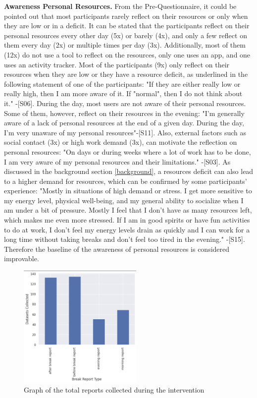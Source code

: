 \documentclass{hasel_thesis}
\begin{document}
\textbf{Awareness Personal Resources.}
From the Pre-Questionnaire, it could be pointed out that most participants rarely reflect on their resources or only when they are low or in a deficit.  It can be stated that the participants reflect on their personal resources every other day (5x) or barely (4x), and only a few reflect on them every day (2x) or multiple times per day (3x).  Additionally, most of them (12x) do not use a tool to reflect on the resources, only one uses an app, and one uses an activity tracker.  Most of the participants (9x) only reflect on their resources when they are low or they have a resource deficit, as underlined in the following statement of one of the participants: "If they are either really low or really high, then I am more aware of it.  If "normal", then I do not think about it." -[S06]. During the day, most users are not aware of their personal resources.  Some of them, however, reflect on their resources in the evening: "I'm generally aware of a lack of personal resources at the end of a given day.  During the day, I'm very unaware of my personal resources"-[S11].  Also, external factors such as social contact (3x) or high work demand (3x), can motivate the reflection on personal resources: "On days or during weeks where a lot of work has to be done, I am very aware of my personal resources and their limitations." -[S03]. As discussed in the background section \ref{background}, a resources deficit can also lead to a higher demand for resources, which can be confirmed by some participants' experience: "Mostly in situations of high demand or stress.  I get more sensitive to my energy level, physical well-being, and my general ability to socialize when I am under a bit of pressure.  Mostly I feel that I don't have as many resources left, which makes me even more stressed.  If I am in good spirits or have fun activities to do at work, I don't feel my energy levels drain as quickly and I can work for a long time without taking breaks and don't feel too tired in the evening." -[S15]. Therefore the baseline of the awareness of personal resources is considered improvable.

\begin{figure}[htp]
    \centering
    \includegraphics[width=6cm]{hasel_thesis/images/overall_reports.png}
    \caption{Graph of the total reports collected during the intervention}
    \label{fig:overall_reports}
\end{figure}
\end{document}
